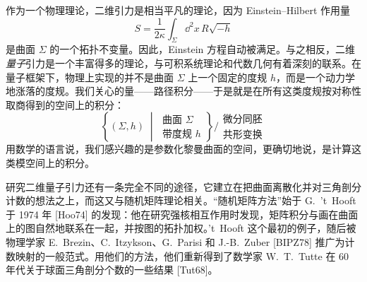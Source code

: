 
作为一个物理理论，二维引力是相当平凡的理论，因为 Einstein--Hilbert 作用量
\begin{equation}
  S = \frac{1}{2\kappa} \int_{\Sigma} \dd^2 x \, R \sqrt{-h}
  \tag{1.1}
\end{equation}
是曲面 $\Sigma$ 的一个拓扑不变量。因此，Einstein 方程自动被满足。与之相反，二维\emph{量子}引力是一个丰富得多的理论，与可积系统理论和代数几何有着深刻的联系。在量子框架下，物理上实现的并不是曲面 $\Sigma$ 上一个固定的度规 $h$，而是一个动力学地涨落的度规。我们关心的量——路径积分——于是就是在所有这类度规按对称性取商得到的空间上的积分：
\begin{equation}
  \left\{ (\Sigma , h) \;\middle|\;
  \begin{array}{c}
    \text{曲面 } \Sigma \\[2pt]
    \text{带度规 } h
  \end{array}
  \right\}
  \Bigg/
  \begin{array}{c}
    \text{微分同胚} \\[2pt]
    \text{共形变换}
  \end{array}
  \tag{1.2}
\end{equation}
用数学的语言说，我们感兴趣的是参数化黎曼曲面的空间，更确切地说，是计算这类模空间上的积分。


研究二维量子引力还有一条完全不同的途径，它建立在把曲面离散化并对三角剖分计数的想法之上，而这又与随机矩阵理论相关。“随机矩阵方法”始于 G.~'t~Hooft 于 1974 年 [Hoo74] 的发现：他在研究强核相互作用时发现，矩阵积分与画在曲面上的图自然地联系在一起，并按图的拓扑加权。't~Hooft 这个最初的例子，随后被物理学家 E.~Brezin、C.~Itzykson、G.~Parisi 和 J.-B.~Zuber [BIPZ78] 推广为计数映射的一般范式。用他们的方法，他们重新得到了数学家 W.~T.~Tutte 在 60 年代关于球面三角剖分个数的一些结果 [Tut68]。

